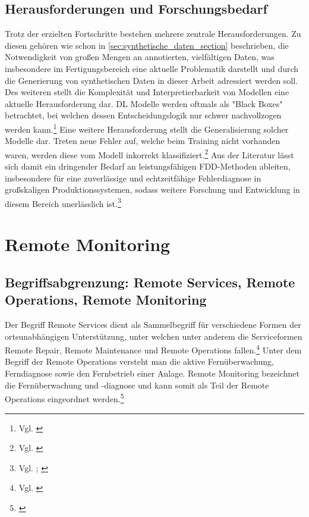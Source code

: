 \subsection{Herausforderungen und Forschungsbedarf}
Trotz der erzielten Fortschritte bestehen mehrere zentrale Herausforderungen. Zu diesen gehören wie schon in \ref{sec:synthetische_daten_section} beschrieben, die Notwendigkeit von großen Mengen an annotierten, vielfältigen Daten, was insbesondere im Fertigungsbereich eine aktuelle Problematik darstellt und durch die Generierung von synthetischen Daten in dieser Arbeit adressiert werden soll. Des weiteren stellt die Komplexität und Interpretierbarkeit von Modellen eine aktuelle Herausforderung dar. \ac{DL} Modelle werden oftmals als "Black Boxes" betrachtet, bei welchen dessen Entscheidungslogik nur schwer nachvollzogen werden kann.\footnote{Vgl. \cite[S. 10]{chai_deep_2021}} Eine weitere Herausforderung stellt die Generalisierung solcher Modelle dar. Treten neue Fehler auf, welche beim Training nicht vorhanden waren, werden diese vom Modell inkorrekt klassifiziert.\footnote{Vgl. \cite[S. 440]{wu_transformer-based_2023}}
Aus der Literatur lässt sich damit ein dringender Bedarf an leistungsfähigen \ac{FDD}-Methoden ableiten, insbesondere für eine zuverlässige und echtzeitfähige Fehlerdiagnose in großskaligen Produktionssystemen, sodass weitere Forschung und Entwicklung in diesem Bereich unerlässlich ist.\footnote{Vgl. \cite[S. 4]{seid_ahmed_advances_2025}; \cite[S. 442]{wu_transformer-based_2023}}


\section{Remote Monitoring}

\subsection{Begriffsabgrenzung: Remote Services, Remote Operations, Remote Monitoring}
Der Begriff Remote Services dient als Sammelbegriff für verschiedene Formen der ortsunabhängigen Unterstützung, unter welchen unter anderem die Serviceformen Remote Repair, Remote Maintenance und Remote Operations fallen.\footnote{Vgl. \cite[S. 5]{holtbrugge_remote_2007}}
Unter dem Begriff der Remote Operations versteht man die aktive Fernüberwachung, Ferndiagnose sowie den Fernbetrieb einer Anlage. Remote Monitoring bezeichnet die Fernüberwachung und -diagnose und kann somit als Teil der Remote Operations eingeordnet werden.\footnote{\cite[S. 592 f.]{vogel-heuser_remote_2024}}

